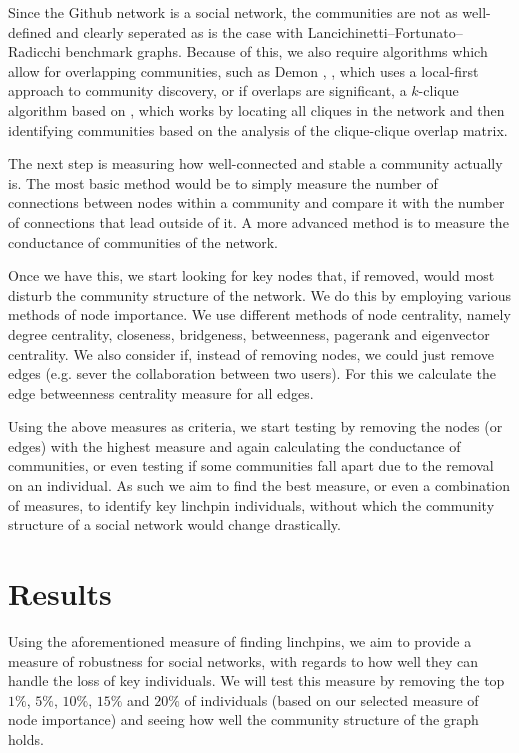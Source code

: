 \documentclass[9pt,twocolumn,twoside]{pnas-new}
\begin{document}
Since the Github network is a social network, the communities are not as well-defined and clearly seperated as is the case with Lancichinetti–Fortunato–Radicchi benchmark graphs.
Because of this, we also require algorithms which allow for overlapping communities, 
such as Demon \cite{Demon}, \cite{coscia-rossetti}, which uses a local-first approach to community discovery, or if overlaps are significant,
a $k$-clique algorithm based on \cite{palla-derenyi}, which works by locating all cliques in the network and then identifying communities based on the analysis of the clique-clique overlap matrix.

The next step is measuring how well-connected and stable a community actually is.
The most basic method would be to simply measure the number of connections between nodes within a community and compare it with the number of connections that lead outside of it.
A more advanced method is to measure the conductance \cite{leskovec-lang-mahoney} of communities of the network. 

Once we have this, we start looking for key nodes that, if removed, would most disturb the community structure of the network.
We do this by employing various methods of node importance.
We use different methods of node centrality, namely degree centrality, closeness, bridgeness, betweenness, pagerank and eigenvector centrality.
We also consider if, instead of removing nodes, we could just remove edges (e.g. sever the collaboration between two users).
For this we calculate the edge betweenness centrality measure for all edges.

Using the above measures as criteria, we start testing by removing the nodes (or edges) with the highest measure and 
again calculating the conductance of communities, 
or even testing if some communities fall apart due to the removal on an individual.
As such we aim to find the best measure, or even a combination of measures, to identify key linchpin individuals, 
without which the community structure of a social network would change drastically.

\section*{Results}

Using the aforementioned measure of finding linchpins, we aim to provide a measure of robustness for social networks,
with regards to how well they can handle the loss of key individuals. 
We will test this measure by removing the top $1\%$, $5\%$, $10\%$, $15\%$ and $20\%$ of individuals (based on our selected measure of node importance) 
and seeing how well the community structure of the graph holds.
\end{document}

